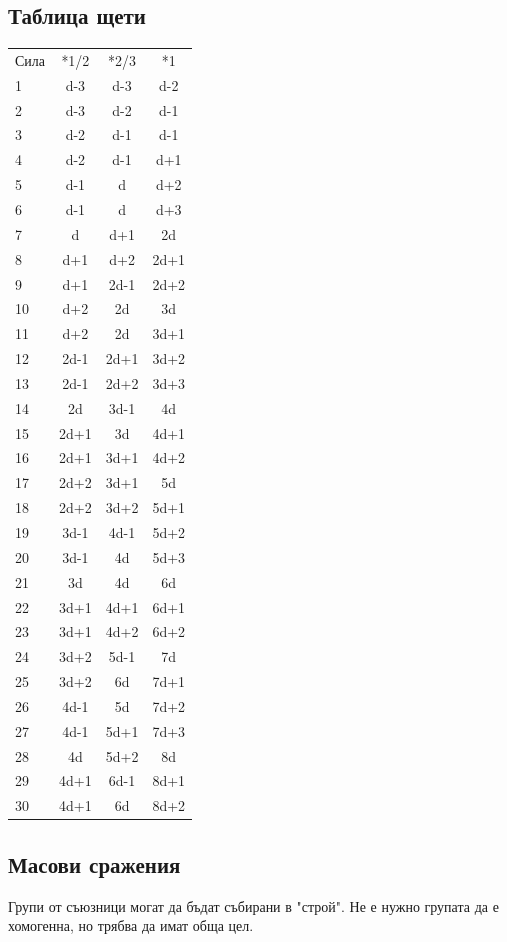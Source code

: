 \subsection{Таблица щети}
\begin{multicols}{2}
\begin{tabular}{l | c | c | c}
Сила & *1/2 & *2/3 & *1  \\
1  & d-3  & d-3  & d-2   \\
2  & d-3  & d-2  & d-1   \\
3  & d-2  & d-1  & d-1   \\
4  & d-2  & d-1  & d+1   \\
5  & d-1  & d    & d+2   \\
6  & d-1  & d    & d+3   \\
7  & d    & d+1  & 2d    \\
8  & d+1  & d+2  & 2d+1  \\
9  & d+1  & 2d-1 & 2d+2  \\
10 & d+2  & 2d   & 3d    \\
11 & d+2  & 2d   & 3d+1  \\
12 & 2d-1 & 2d+1 & 3d+2  \\
13 & 2d-1 & 2d+2 & 3d+3  \\
14 & 2d   & 3d-1 & 4d    \\
15 & 2d+1 & 3d   & 4d+1  \\
16 & 2d+1 & 3d+1 & 4d+2  \\
17 & 2d+2 & 3d+1 & 5d    \\
18 & 2d+2 & 3d+2 & 5d+1  \\
19 & 3d-1 & 4d-1 & 5d+2  \\
20 & 3d-1 & 4d   & 5d+3  \\
21 & 3d   & 4d   & 6d    \\
22 & 3d+1 & 4d+1 & 6d+1  \\
23 & 3d+1 & 4d+2 & 6d+2  \\
24 & 3d+2 & 5d-1 & 7d    \\
25 & 3d+2 & 6d   & 7d+1  \\
26 & 4d-1 & 5d   & 7d+2  \\
27 & 4d-1 & 5d+1 & 7d+3  \\
28 & 4d   & 5d+2 & 8d    \\
29 & 4d+1 & 6d-1 & 8d+1  \\
30 & 4d+1 & 6d   & 8d+2
\end{tabular}

\subsection{Масови сражения}
Групи от съюзници могат да бъдат събирани в "строй".
Не е нужно групата да е хомогенна, но трябва да имат обща цел.


\end{multicols}
